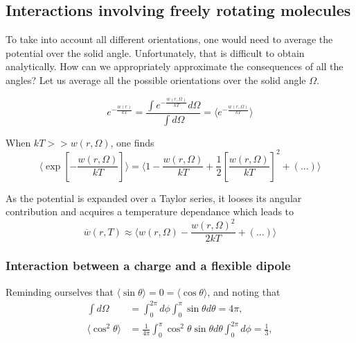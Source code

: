 \documentclass[../phys-f308.tex]{subfiles}
\begin{document}
    \subsection{Interactions involving freely rotating molecules}

    To take into account all different orientations, one would need to average the potential over the solid angle. Unfortunately, that is difficult to obtain analytically. How can we appropriately approximate the consequences of all the angles? Let us average all the possible orientations over the solid angle $\Omega$.

    \begin{equation}
        e^{-\frac{w(r)}{kT}} = \frac{\int e^{-\frac{w(r,\Omega)}{kT}}d\Omega}{\int d\Omega} = \Bigg\langle e^{-\frac{w(r,\Omega)}{kT}}\Bigg\rangle
    \end{equation}

    When $kT>>w(r,\Omega)$, one finds
    \begin{equation}
        \Bigg\langle\exp\left[-\frac{w(r,\Omega)}{kT}\right]\Bigg\rangle = \Bigg\langle 1 - \frac{w(r,\Omega)}{kT} + \frac{1}{2}\left[\frac{w(r,\Omega)}{kT}\right]^2 + (...)\Bigg\rangle
    \end{equation}

    As the potential is expanded over a Taylor series, it looses its angular contribution and acquires a temperature dependance which leads to
    \begin{equation}
        \overline{w}(r,T) \approx \Bigg\langle w(r,\Omega)-\frac{w(r,\Omega)^2}{2kT}+(...)\Bigg\rangle
    \end{equation}

    \subsubsection{Interaction between a charge and a flexible dipole}

    Reminding ourselves that $\Big\langle\sin\theta\Big\rangle = 0 = \Big\langle\cos\theta\Big\rangle$, and noting that
    \begin{align}
        \int d\Omega &= \int_0^{2\pi}d\phi\int_0^\pi\sin\theta d\theta = 4\pi,\\
        \big\langle\cos^2\theta\big\rangle &= \frac{1}{4\pi} \int_0^\pi \cos^2\theta\sin\theta d\theta\int_0^{2\pi}d\phi = \frac{1}{3},
    \end{align}
\end{document}
